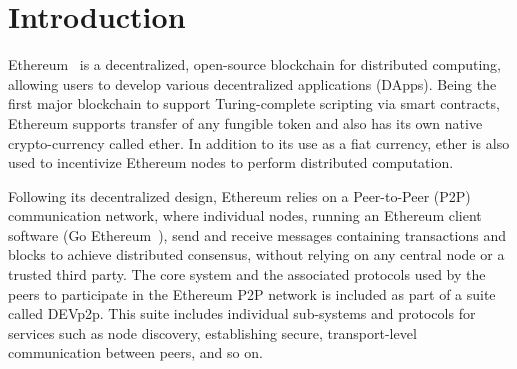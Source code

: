 
\section{Introduction}

Ethereum~\cite{} is a decentralized, open-source blockchain for distributed computing, allowing users to develop various decentralized applications (DApps). Being the first major blockchain to support Turing-complete scripting via smart contracts, Ethereum supports transfer of any fungible token and also has its own native crypto-currency called ether. In addition to its use as a fiat currency,  ether is also used to incentivize Ethereum nodes to perform distributed computation. 



Following its decentralized design, Ethereum relies on a Peer-to-Peer (P2P) communication network, where individual nodes, running an Ethereum client software (\eg Go Ethereum~\cite{go-ethereum}), send and receive messages containing transactions and blocks to achieve distributed consensus, without relying on any central node or a trusted third party. The core system and the associated protocols used by the peers to participate in the Ethereum P2P network is included as part of a suite called DEVp2p. This suite includes individual sub-systems and protocols for services such as node discovery, establishing secure, transport-level communication between peers, and so on. 


